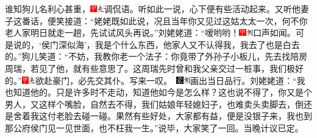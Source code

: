 谁知狗儿名利心甚重，{\includegraphics[width=3mm]{../Images/00002}\includegraphics[width=3mm]{../Images/00012}\footnotesize \kaishu 调侃语。}听如此一说，心下便有些活动起来。又听他妻子这番话，便笑接道：“姥姥既如此说，况且当年你又见过这姑太太一次，何不你老人家明日就走一趟，先试试风头再说。”刘姥姥道：“嗳哟哟！{\includegraphics[width=3mm]{../Images/00002}\includegraphics[width=3mm]{../Images/00011}\footnotesize \kaishu 口声如闻。}可是说的，‘侯门深似海’，我是个什么东西，他家人又不认得我，我去了也是白去的。”狗儿笑道：“不妨，我教你老一个法子：你竟带了外孙子小板儿，先去找陪房周瑞，若见了他，就有些意思了。这周瑞先时曾和我父亲交过一桩事，我们极好的。”{{\includegraphics[width=3mm]{../Images/00002}\includegraphics[width=3mm]{../Images/00012}\footnotesize \kaishu 欲赴豪门，必先交其仆。写来一叹。　}\includegraphics[width=3mm]{../Images/00006}\includegraphics[width=3mm]{../Images/00011}\footnotesize \kaishu 画出当日品行。}刘姥姥道：“我也知道他的。只是许多时不走动，知道他如今是怎么样？这也说不得了，你又是个男人，又这样个嘴脸，自然去不得，我们姑娘年轻媳妇子，也难卖头卖脚去，倒还是舍着我这付老脸去碰一碰。果然有些好处，大家都有益，便是没银子来，我也到那公府侯门见一见世面，也不枉我一生。”说毕，大家笑了一回。当晚计议已定。

